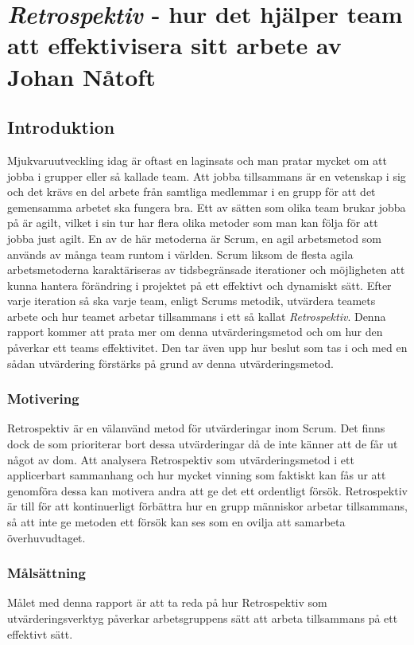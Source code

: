  \chapter{\textit{Retrospektiv} - hur det hjälper team att effektivisera sitt arbete av Johan Nåtoft}


\section{Introduktion}
\label{cha:johan_n-introduction}
Mjukvaruutveckling idag är oftast en laginsats och man pratar mycket om att jobba i grupper eller så kallade team.
Att jobba tillsammans är en vetenskap i sig och det krävs en del arbete från samtliga medlemmar i en grupp för att det gemensamma arbetet ska fungera bra.
Ett av sätten som olika team brukar jobba på är agilt, vilket i sin tur har flera olika metoder som man kan följa för att jobba just agilt.
En av de här metoderna är Scrum, en agil arbetsmetod som används av många team runtom i världen.
Scrum liksom de flesta agila arbetsmetoderna karaktäriseras av tidsbegränsade iterationer och möjligheten att kunna hantera förändring i
projektet på ett effektivt och dynamiskt sätt. Efter varje iteration så ska varje team, enligt Scrums metodik, utvärdera teamets arbete och hur teamet arbetar tillsammans i ett så kallat \textit{Retrospektiv}. Denna rapport kommer att prata mer om denna utvärderingsmetod och om hur den påverkar ett teams effektivitet. Den tar även upp hur beslut som tas i och med en sådan utvärdering förstärks på grund av denna utvärderingsmetod.

\subsection{Motivering}
\label{sec:johan_n-motivation}
Retrospektiv är en välanvänd metod för utvärderingar inom Scrum. Det finns dock de som prioriterar bort dessa utvärderingar då de inte känner att de får ut något av dom. Att analysera Retrospektiv som utvärderingsmetod i ett applicerbart sammanhang och hur mycket vinning som faktiskt kan fås ur att genomföra dessa kan motivera andra att ge det ett ordentligt försök. Retrospektiv är till för att kontinuerligt förbättra hur en grupp människor arbetar tillsammans, så att inte ge metoden ett försök kan ses som en ovilja att samarbeta överhuvudtaget.


\subsection{Målsättning}
\label{sec:johan_n-aim}
Målet med denna rapport är att ta reda på hur Retrospektiv som utvärderingsverktyg
påverkar arbetsgruppens sätt att arbeta tillsammans på ett effektivt sätt. 


